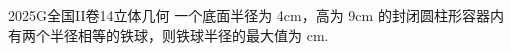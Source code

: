 
\begin{problem}{2025}{G}{全国II卷}{14}{立体几何}
一个底面半径为 4cm，高为 9cm 的封闭圆柱形容器内有两个半径相等的铁球，则铁球半径的最大值为 \underline{\hspace{4em}} cm.
\end{problem}